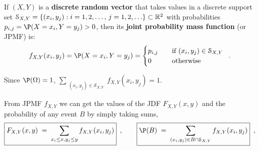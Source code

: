 \begin{definition}[JPMF]
If $(X,Y)$ is a {\bf discrete random vector} that takes values in a discrete support set $\mathcal{S}_{X,Y} = \{(x_i,y_j): i=1,2,\ldots, \, j=1,2,\ldots\} \subset \mathbb{R}^2$ with probabilities $p_{i,j}=\P(X=x_i,Y=y_j)>0$, then its \textbf{joint probability mass function} (or JPMF) is:
\begin{equation}\label{Eq:j2DPMF}
f_{X,Y}(x_i,y_j) = \P(X=x_i,Y=y_j) %
=\begin{cases}
p_{i,j}&\quad \textrm{if } (x_i,y_j) \in \mathcal{S}_{X,Y}\\
0&\quad \textrm{otherwise}
\end{cases}  \enspace .
\end{equation}

Since $\P(\Omega)=1$, $\sum_{{\substack{(x_i,y_j) \in \mathcal{S}_{X,Y}}}}f_{X,Y}(x_i,y_j)=1$.
\end{definition}

From JPMF $f_{X,Y}$ we can get the values of the JDF $F_{X,Y}(x,y)$ and the probability of any event $B$ by simply taking sums,
\begin{equation}\label{Eq:2DiscretejDFFromjPMF}
\boxed{F_{X,Y}(x,y)\;=\;\sum_{x_i\leq x, y_j \leq y}f_{X,Y}(x_i,y_j) }\enspace ,
\qquad \boxed{\P(B)\;=\;\sum_{\substack{(x_i, y_j) \in B \cap \mathcal{S}_{X,Y}}}f_{X,Y}(x_i,y_j) }\enspace ,
\end{equation}

